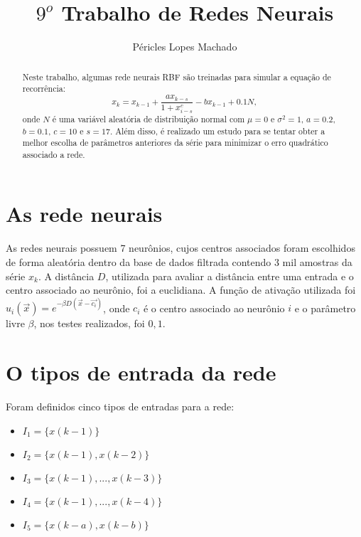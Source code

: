 \documentclass[10pt,journal,letterpaper,compsoc]{IEEEtran}
\title{$9^o$ Trabalho de Redes Neurais}
\author{Péricles Lopes Machado}
\newcommand{\fra}[2]{
	\displaystyle \frac{{#1}}{{#2}} 
}
\begin{document}
\maketitle

\begin{abstract}

Neste trabalho, algumas rede neurais RBF são treinadas para simular a equação de recorrência:
\begin{equation}
x_k = x_{k-1} + \fra{a x_{k-s} } { 1 + x_{i-s} ^ c} - b x_{k-1} + 0.1 N ,
\label{eq.1}
\end{equation}
onde $N$ é uma variável aleatória
de distribuição normal com $\mu = 0$ e $\sigma^2 = 1$, $a = 0.2$,
$b = 0.1$, $c = 10$ e $s = 17$. Além disso, é realizado um estudo
para se tentar obter a melhor escolha
de parâmetros anteriores da série para minimizar o erro quadrático associado a rede.

\end{abstract}

\section{As rede neurais}

As redes neurais possuem 7 neurônios, cujos centros associados foram escolhidos de forma aleatória
dentro da base de dados filtrada contendo 3 mil amostras da série $x_k$. A distância $D$,
utilizada para avaliar a distância entre uma entrada e o centro associado ao neurônio, foi a euclidiana.
A função de ativação utilizada foi $u_i(\vec{x}) =  e^{-\beta  D(\vec{x} - \vec{c_i})}$, onde $c_i$ é
o centro associado ao neurônio $i$ e o parâmetro livre $\beta$, nos testes realizados, foi $0,1$.

\section{O tipos de entrada da rede}
Foram definidos cinco tipos de entradas para a rede:

\begin{itemize}
\item $I_1 = \{x(k-1)\}$
\item $I_2 = \{x(k-1), x(k-2)\}$
\item $I_3 = \{x(k-1), ... , x(k-3)\}$
\item $I_4 = \{x(k-1), ... , x(k-4)\}$
\item $I_5 = \{x(k-a), x(k-b)\}$
\end{itemize}
\end{document}

